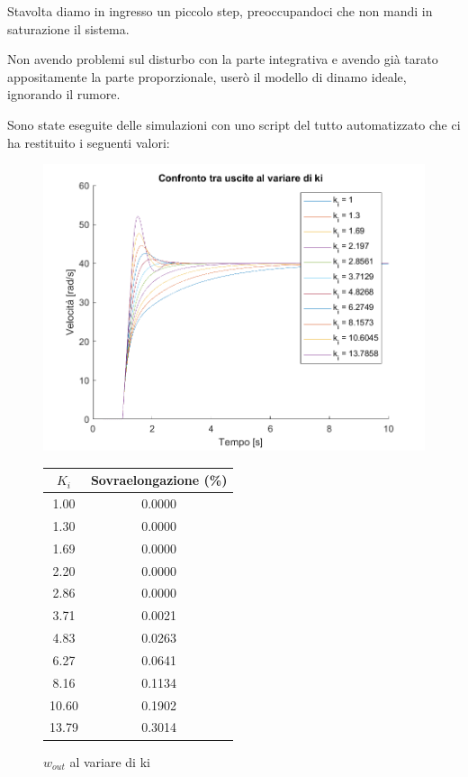 \documentclass[a4paper,12pt]{article}
\begin{document}
Stavolta diamo in ingresso un piccolo step, preoccupandoci che non mandi in saturazione il sistema.

Non avendo problemi sul disturbo con la parte integrativa e avendo già tarato appositamente la parte proporzionale, userò il modello di dinamo ideale, ignorando il rumore.

\vspace{0.5cm}

Sono state eseguite delle simulazioni con uno script del tutto automatizzato che ci ha restituito i seguenti valori:

\begin{figure}[h!]
\centering
\begin{minipage}{0.6\textwidth}
    \centering
    \includegraphics[width=\linewidth]{Immagini/PlotMatlab/confrontoUsciteKi.png} 
    \caption{$w_{out}$ al variare di ki}
    \label{fig:sovraelongazione_ki}
\end{minipage}
\hfill
\begin{minipage}{0.38\textwidth}
    \centering
    \small
    \begin{tabular}{|c|c|}
        \hline
        \textbf{$K_i$} & \textbf{Sovraelongazione (\%)} \\
        \hline
        1.00  & 0.0000 \\
        1.30  & 0.0000 \\
        1.69  & 0.0000 \\
        2.20  & 0.0000 \\
        2.86  & 0.0000 \\
        3.71  & 0.0021 \\
        4.83  & 0.0263 \\
        6.27  & 0.0641 \\
        8.16  & 0.1134 \\
        10.60 & 0.1902 \\
        13.79 & 0.3014 \\
        \hline
    \end{tabular}
    \label{tab:sovraelongazione_ki}
\end{minipage}
\end{figure}
\end{document}
